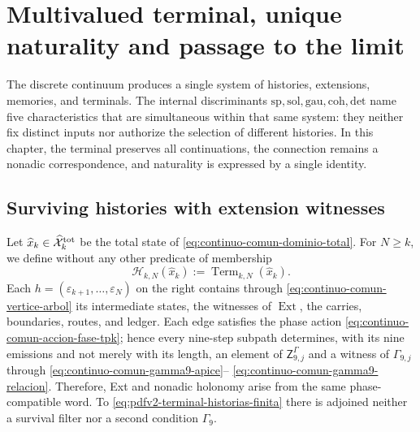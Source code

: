 \chapter[Terminal, naturality, and limit]{Multivalued terminal, unique naturality and passage to the limit}
\label{chap:pdfv2-terminal-naturalidad-limite}

\begin{thesisbox}
The discrete continuum produces a single system of histories, extensions, memories, and terminals. The internal discriminants \(\mathrm{sp},\mathrm{sol},\mathrm{gau},\mathrm{coh},\mathrm{det}\) name five characteristics that are simultaneous within that same system: they neither fix distinct inputs nor authorize the selection of different histories. In this chapter, the terminal preserves all continuations, the connection remains a nonadic correspondence, and naturality is expressed by a single identity.
\end{thesisbox}

\section{Surviving histories with extension witnesses}

Let
\(\widehat x_k\in\widehat{\mathcal X}^{\rm tot}_k\) be the total state of
\eqref{eq:continuo-comun-dominio-total}. For \(N\geq k\), we define without
any other predicate of membership
\begin{equation}
\label{eq:pdfv2-terminal-historias-finita}
 \mathscr H_{k,N}(\widehat x_k)
 :=\operatorname{Term}_{k,N}(\widehat x_k).
\end{equation}
Each
\(h=(\varepsilon_{k+1},\ldots,\varepsilon_N)\) on the right contains through
\eqref{eq:continuo-comun-vertice-arbol} its intermediate states, the witnesses
of \(\operatorname{Ext}\), the carries, boundaries, routes, and ledger.
Each edge satisfies the phase action
\eqref{eq:continuo-comun-accion-fase-tpk}; hence every nine-step subpath
determines, with its nine emissions and not merely with its length, an
element of \(\mathsf Z^\Gamma_{9,j}\) and a witness of
\(\Gamma_{9,j}\) through
\eqref{eq:continuo-comun-gamma9-apice}--
\eqref{eq:continuo-comun-gamma9-relacion}. Therefore, Ext and nonadic holonomy
arise from the same phase-compatible word. To \eqref{eq:pdfv2-terminal-historias-finita} there is adjoined neither a survival filter nor a
second condition \(\Gamma_9\).

